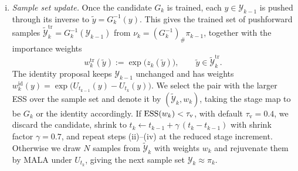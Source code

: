 \documentclass{article}
\begin{document}
\begin{enumerate}[(i)]
\item \emph{Sample set update.} Once the candidate $G_k$ is trained, each $y \in \mathcal Y_{k-1}$ is pushed through its inverse to $\tilde y = G_k^{-1}(y)$. This gives the trained set of pushforward samples $\tilde{\mathcal Y}_k^{\mathrm{tr}} = G_k^{-1}(\mathcal Y_{k-1})$ from $\nu_k = (G_k^{-1})_{\#}\pi_{k-1}$, together with the importance weights
\begin{equation*}
    w_k^{\mathrm{tr}}(\tilde y) := \exp\bigl(z_k(\tilde y)\bigr),
    \qquad \tilde y \in \tilde{\mathcal Y}_k^{\mathrm{tr}} .
\end{equation*}
The identity proposal keeps $\mathcal Y_{k-1}$ unchanged and has weights $w_k^{\mathrm{id}}(y)=\exp\big(U_{t_{k-1}}(y)-U_{t_k}(y)\big)$. We select the pair with the larger ESS over the sample set and denote it by $(\tilde{\mathcal Y}_k,w_k)$, taking the stage map to be $G_k$ or the identity accordingly. If $\mathrm{ESS}(w_k) < \tau_{\mathrm v}$, with default $\tau_{\mathrm v} = 0.4$, we discard the candidate, shrink to $t_k \gets t_{k-1} + \gamma\,(t_k - t_{k-1})$ with shrink factor $\gamma=0.7$, and repeat steps (ii)--(iv) at the reduced stage increment. Otherwise we draw $N$ samples from $\tilde{\mathcal Y}_k$ with weights $w_k$ and rejuvenate them by MALA under $U_{t_k}$, giving the next sample set $\mathcal Y_k\approx\pi_k$.
\end{enumerate}
\end{document}
